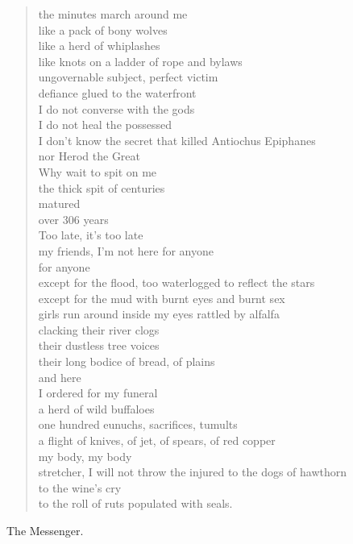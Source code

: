\documentclass[letterpaper,article,12pt,oneside,notitlepage]{memoir}
\begin{document}
\begin{verse}
the minutes march around me \\
like a pack of bony wolves \\
like a herd of whiplashes \\
like knots on a ladder of rope and bylaws \\
ungovernable subject, perfect victim \\
defiance glued to the waterfront \\
I do not converse with the gods \\
I do not heal the possessed \\
I don't know the secret that killed Antiochus Epiphanes \\
nor Herod the Great \\
Why wait to spit on me \\
the thick spit of centuries \\
matured \\
over 306 years \\
Too late, it's too late \\
my friends, I'm not here for anyone \\
for anyone \\
except for the flood, too waterlogged to reflect the stars \\
except for the mud with burnt eyes and burnt sex \\
girls run around inside my eyes rattled by alfalfa \\
clacking their river clogs \\
their dustless tree voices \\
their long bodice of bread, of plains \\
and here \\
I ordered for my funeral \\
a herd of wild buffaloes \\
one hundred eunuchs, sacrifices, tumults \\
a flight of knives, of jet, of spears, of red copper \\
my body, my body \\
stretcher, I will not throw the injured to the dogs of hawthorn \\
to the wine's cry \\
to the roll of ruts populated with seals. \\
\end{verse}

\begin{center}The Messenger.\end{center}
\end{document}
